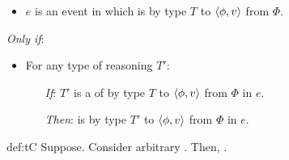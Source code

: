 \begin{note}
  \begin{proposition}[\tC{2}]
    \label{def:tC}

    \noindent%

    \begin{itemize}
    \item
      \(e\) is an event in which \vAgent{} is \emph{} by type \(T\) to \(\langle \phi, v \rangle\) from \(\Phi\).
    \end{itemize}

    \emph{Only if}:

    \begin{itemize}[noitemsep]
    \item
      For any type of reasoning \(T'\):
      \begin{itemize}
      \item[\emph{If}:]
        \(T'\) is a \tRep{} of \vAgent{} \tC{} by type \(T\) to \(\langle \phi, v \rangle\) from \(\Phi\) in \(e\).
      \item[\emph{Then}:]
        \vAgent{} is \ptCV{} by type \(T'\) to \(\langle \phi, v \rangle\) from \(\Phi\) in \(e\).
      \end{itemize}
    \end{itemize}
    \vspace{-\baselineskip}
  \end{proposition}

  \begin{argument}{def:tC}
    Suppose.
    Consider arbitrary \tRep{}.
    Then, \ptC{}.
  \end{argument}
\end{note}

